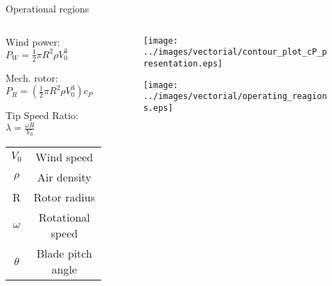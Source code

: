 \begin{frame}{Operational regions}

  \begin{columns}

    \begin{column}{0.4\columnwidth}
      \begin{myitemize}
        \item Wind power: $P_W = \frac{1}{2}\pi R^2 \rho V_0^3$
        \item Mech. rotor: $P_R = \left(\frac{1}{2}\pi R^2 \rho V_0^3\right) c_{P}$
        \item Tip Speed Ratio: $\lambda=\frac{\omega R}{V_0}$
      \end{myitemize}
     
     
      \begin{table}
        \begin{tabular}{cc}
          \toprule
          $V_0$ & Wind speed\\
          $\rho$ & Air density\\
          R & Rotor radius\\
          $\omega$ & Rotational speed\\
          $\theta$ & Blade pitch angle  \\        
          \bottomrule
        \end{tabular}
      \end{table}
    \end{column}

    \begin{column}{0.55\columnwidth}
      \begin{figure}
        \centering
        \texttt{[image: ../images/vectorial/contour\_plot\_cP\_presentation.eps]}
      \end{figure}
      \begin{figure}[H]
        \centering
        \texttt{[image: ../images/vectorial/operating\_reagions.eps]}
      \end{figure}
    \end{column}
    
  \end{columns}


\end{frame}
